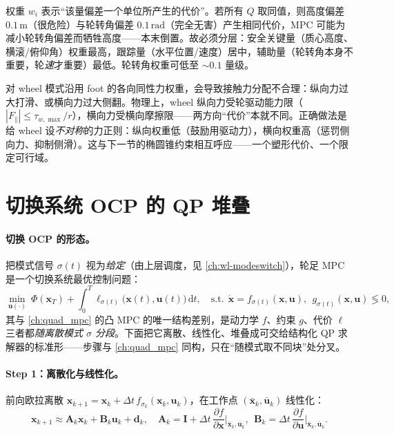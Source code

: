 \begin{insight}
权重 $w_i$ 表示“该量偏差一个单位所产生的代价”。若所有 $Q$ 取同值，则高度偏差 $0.1\,\mathrm{m}$（很危险）与轮转角偏差 $0.1\,\mathrm{rad}$（完全无害）产生相同代价，MPC 可能为减小轮转角偏差而牺牲高度——本末倒置。故必须分层：安全关键量（质心高度、横滚/俯仰角）权重最高，跟踪量（水平位置/速度）居中，辅助量（轮转角本身不重要，轮\emph{速}才重要）最低。轮转角权重可低至 $\sim0.1$ 量级。
\end{insight}

\begin{pitfall}
对 wheel 模式沿用 foot 的各向同性力权重，会导致接触力分配不合理：纵向力过大打滑、或横向力过大侧翻。物理上，wheel 纵向力受轮驱动能力限（$|F_\parallel|\le\tau_{w,\max}/r$），横向力受横向摩擦限——两方向“代价”本就不同。正确做法是给 wheel 设\emph{不对称}的力正则：纵向权重低（鼓励用驱动力），横向权重高（惩罚侧向力、抑制侧滑）。这与下一节的椭圆锥约束相互呼应——一个塑形代价、一个限定可行域。
\end{pitfall}

\section{切换系统 OCP 的 QP 堆叠}
\label{sec:wl-qp}

\paragraph{切换 OCP 的形态。}
把模式信号 $\sigma(t)$ 视为\emph{给定}（由上层调度，见 \cref{ch:wl-modeswitch}），轮足 MPC 是一个切换系统最优控制问题：
\begin{equation}
  \min_{\mathbf{u}(\cdot)}\ \Phi(\mathbf{x}_T)+\int_0^T\ell_{\sigma(t)}\big(\mathbf{x}(t),\mathbf{u}(t)\big)\,\mathrm dt,
  \quad\text{s.t.}\ \ \dot{\mathbf{x}}=f_{\sigma(t)}(\mathbf{x},\mathbf{u}),\ \ g_{\sigma(t)}(\mathbf{x},\mathbf{u})\lessgtr 0,
  \label{eq:wl-ocp}
\end{equation}
其与 \cref{ch:quad_mpc} 的凸 MPC 的唯一结构差别，是动力学 $f$、约束 $g$、代价 $\ell$ 三者都\emph{随离散模式 $\sigma$ 分段}。下面把它离散、线性化、堆叠成可交给结构化 QP 求解器的标准形——步骤与 \cref{ch:quad_mpc} 同构，只在“随模式取不同块”处分叉。

\paragraph{Step 1：离散化与线性化。}
前向欧拉离散 $\mathbf{x}_{k+1}=\mathbf{x}_k+\Delta t\,f_{\sigma_k}(\mathbf{x}_k,\mathbf{u}_k)$，在工作点 $(\bar{\mathbf{x}}_k,\bar{\mathbf{u}}_k)$ 线性化：
\begin{equation}
  \mathbf{x}_{k+1}\approx\mathbf{A}_k\mathbf{x}_k+\mathbf{B}_k\mathbf{u}_k+\mathbf{d}_k,\quad
  \mathbf{A}_k=\mathbf{I}+\Delta t\,\frac{\partial f}{\partial\mathbf{x}}\Big|_{\bar{\mathbf{x}}_k,\bar{\mathbf{u}}_k},\ \
  \mathbf{B}_k=\Delta t\,\frac{\partial f}{\partial\mathbf{u}}\Big|_{\bar{\mathbf{x}}_k,\bar{\mathbf{u}}_k}.
  \label{eq:wl-lin}
\end{equation}

